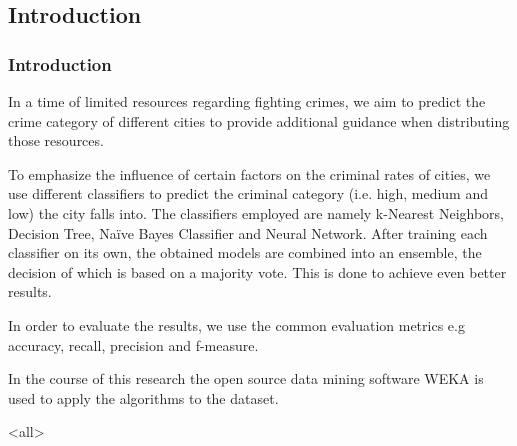 \mode*

\begin{frame}
	\section{Introduction}
	\frametitle{Introduction}
\end{frame}


In a time of limited resources regarding fighting crimes, we aim to predict the crime category of different
cities to provide additional guidance when distributing those resources.

To emphasize the influence of certain factors on the criminal rates of cities, we use different
classifiers to predict the criminal category (i.e. high, medium and low) the city falls into. The classifiers
employed are namely k-Nearest Neighbors, Decision Tree, Na\"ive Bayes Classifier and Neural Network.
After training each classifier on its own, the obtained models are combined into an ensemble, the decision of
which is based on a majority vote. This is done to achieve even better results.

In order to evaluate the results, we use the common evaluation metrics e.g accuracy, recall, precision and
f-measure.

In the course of this research the open source data mining software WEKA is used to apply the algorithms to
the dataset.

\mode<all>